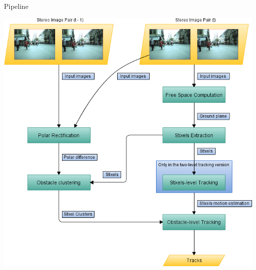 \begin{frame}[plain]{Pipeline}
  \begin{center}
    \includegraphics[height=1.1\textheight]{pipeline_cp04}
  \end{center}
  
  \note {

  }
\end{frame}

